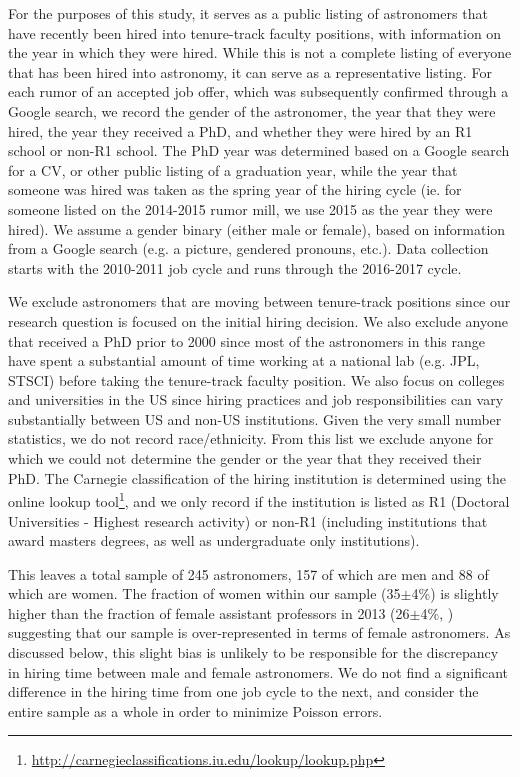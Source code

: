 \documentclass[modern]{aastex62}
\begin{document}
For the purposes of this study, it serves as a public listing of astronomers that have recently been hired into tenure-track faculty positions, with information on the year in which they were hired. While this is not a complete listing of everyone that has been hired into astronomy, it can serve as a representative listing. For each rumor of an accepted job offer, which was subsequently confirmed through a Google search, we record the gender of the astronomer, the year that they were hired, the year they received a PhD, and whether they were hired by an R1 school or non-R1 school. The PhD year was determined based on a Google search for a CV, or other public listing of a graduation year, while the year that someone was hired was taken as the spring year of the hiring cycle (ie. for someone listed on the 2014-2015 rumor mill, we use 2015 as the year they were hired). We assume a gender binary (either male or female), based on information from a Google search (e.g. a picture, gendered pronouns, etc.). Data collection starts with the 2010-2011 job cycle and runs through the 2016-2017 cycle. 

We exclude astronomers that are moving between tenure-track positions since our research question is focused on the initial hiring decision. We also exclude anyone that received a PhD prior to 2000 since most of the astronomers in this range have spent a substantial amount of time working at a national lab (e.g. JPL, STSCI) before taking the tenure-track faculty position. We also focus on colleges and universities in the US since hiring practices and job responsibilities can vary substantially between US and non-US institutions. Given the very small number statistics, we do not record race/ethnicity. From this list we exclude anyone for which we could not determine the gender or the year that they received their PhD. The Carnegie classification of the hiring institution is determined using the online lookup tool\footnote{\url{http://carnegieclassifications.iu.edu/lookup/lookup.php}}, and we only record if the institution is listed as R1 (Doctoral Universities - Highest research activity) or non-R1 (including institutions that award masters degrees, as well as undergraduate only institutions). 

This leaves a total sample of 245 astronomers, 157 of which are men and 88 of which are women. The fraction of women within our sample (35$\pm$4\%) is slightly higher than the fraction of female assistant professors in 2013 (26$\pm$4\%, \citet{hug14}) suggesting that our sample is over-represented in terms of female astronomers. As discussed below, this slight bias is unlikely to be responsible for the  discrepancy in hiring time between male and female astronomers. We do not find a significant difference in the hiring time from one job cycle to the next, and consider the entire sample as a whole in order to minimize Poisson errors. 
\end{document}
